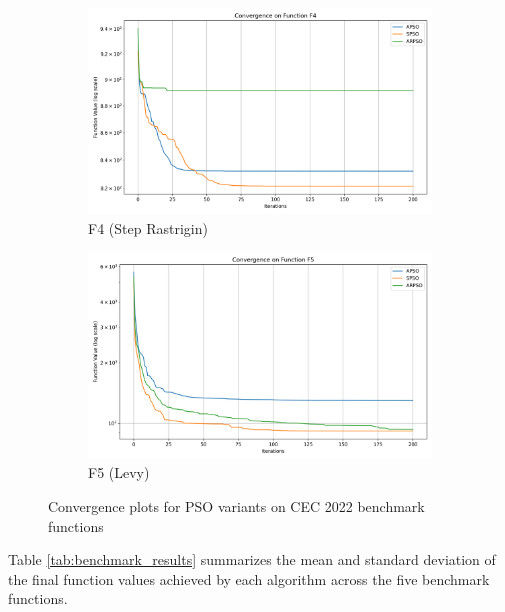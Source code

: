 \documentclass[conference]{IEEEtran}
\begin{document}
\begin{figure}[htbp]
\vspace{0.5cm}
\begin{subfigure}{0.32\linewidth}
    \centering
    \includegraphics[width=\linewidth]{../plots/cec_bench/cec_convergence_f4.png}
    \caption{F4 (Step Rastrigin)}
    \label{fig:conv_f4}
\end{subfigure}
\hfill
\begin{subfigure}{0.32\linewidth}
    \centering
    \includegraphics[width=\linewidth]{../plots/cec_bench/cec_convergence_f5.png}
    \caption{F5 (Levy)}
    \label{fig:conv_f5}
\end{subfigure}

\caption{Convergence plots for PSO variants on CEC 2022 benchmark functions}
\label{fig:convergence_plots}
\end{figure}

Table \ref{tab:benchmark_results} summarizes the mean and standard deviation of the final function values achieved by each algorithm across the five benchmark functions.
\end{document}
